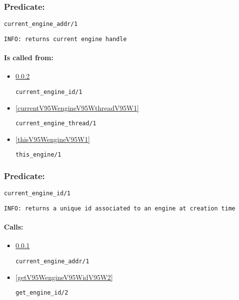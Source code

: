 \subsubsection{Predicate:} \label{currentV95WengineV95WaddrV95W1}

\begin{verbatim}
current_engine_addr/1
\end{verbatim}

{\small \begin{verbatim}
INFO: returns current engine handle

\end{verbatim}}
\paragraph{Is called from:} 
\begin{itemize}
\item \ref{currentV95WengineV95WidV95W1} 
\begin{verbatim}
current_engine_id/1
\end{verbatim}

\item \ref{currentV95WengineV95WthreadV95W1} 
\begin{verbatim}
current_engine_thread/1
\end{verbatim}

\item \ref{thisV95WengineV95W1} 
\begin{verbatim}
this_engine/1
\end{verbatim}

\end{itemize}

\subsubsection{Predicate:} \label{currentV95WengineV95WidV95W1}

\begin{verbatim}
current_engine_id/1
\end{verbatim}

{\small \begin{verbatim}
INFO: returns a unique id associated to an engine at creation time

\end{verbatim}}
\paragraph{Calls:} 
\begin{itemize}
\item \ref{currentV95WengineV95WaddrV95W1} 
\begin{verbatim}
current_engine_addr/1
\end{verbatim}

\item \ref{getV95WengineV95WidV95W2} 
\begin{verbatim}
get_engine_id/2
\end{verbatim}

\end{itemize}
